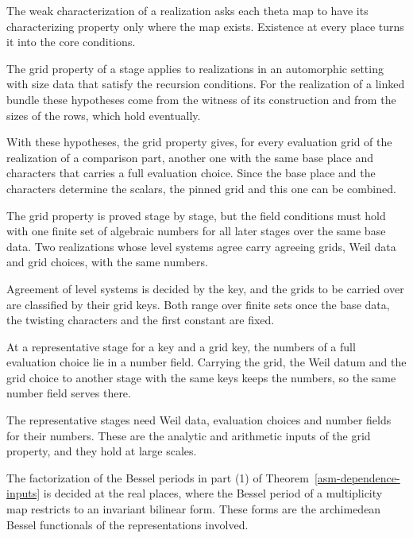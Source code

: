 The weak characterization of a realization asks each theta map to have its
characterizing property only where the map exists. Existence at every place
turns it into the core conditions.

The grid property of a stage applies to realizations in an automorphic setting
with size data that satisfy the recursion conditions. For the realization of a
linked bundle these hypotheses come from the witness of its construction and
from the sizes of the rows, which hold eventually.

With these hypotheses, the grid property gives, for every evaluation grid of
the realization of a comparison part, another one with the same base place and
characters that carries a full evaluation choice. Since the base place and the
characters determine the scalars, the pinned grid and this one can be combined.

The grid property is proved stage by stage, but the field conditions must hold
with one finite set of algebraic numbers for all later stages over the same base
data. Two realizations whose level systems agree carry agreeing grids, Weil data
and grid choices, with the same numbers.

Agreement of level systems is decided by the key, and the grids to be carried
over are classified by their grid keys. Both range over finite sets once the
base data, the twisting characters and the first constant are fixed.

At a representative stage for a key and a grid key, the numbers of a full
evaluation choice lie in a number field. Carrying the grid, the Weil datum and
the grid choice to another stage with the same keys keeps the numbers, so the
same number field serves there.

The representative stages need Weil data, evaluation choices and number fields
for their numbers. These are the analytic and arithmetic inputs of the grid
property, and they hold at large scales.

The factorization of the Bessel periods in part (1) of
Theorem~\ref{asm-dependence-inputs} is decided at the real places, where the
Bessel period of a multiplicity map restricts to an invariant bilinear form.
These forms are the archimedean Bessel functionals of the representations
involved.

